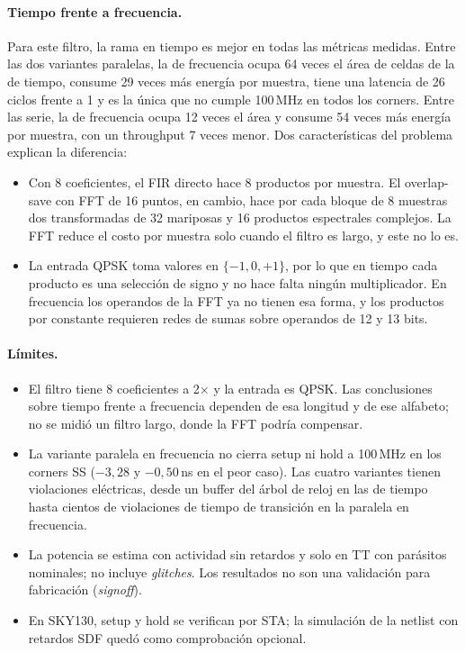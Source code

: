\paragraph{Tiempo frente a frecuencia.} Para este filtro, la rama en tiempo es mejor en todas las métricas medidas. Entre las dos variantes paralelas, la de frecuencia ocupa 64 veces el área de celdas de la de tiempo, consume 29 veces más energía por muestra, tiene una latencia de 26 ciclos frente a 1 y es la única que no cumple 100\,MHz en todos los corners. Entre las serie, la de frecuencia ocupa 12 veces el área y consume 54 veces más energía por muestra, con un throughput 7 veces menor. Dos características del problema explican la diferencia:
\begin{itemize}
  \item Con 8 coeficientes, el FIR directo hace 8 productos por muestra. El overlap-save con FFT de 16 puntos, en cambio, hace por cada bloque de 8 muestras dos transformadas de 32 mariposas y 16 productos espectrales complejos. La FFT reduce el costo por muestra solo cuando el filtro es largo, y este no lo es.
  \item La entrada QPSK toma valores en $\{-1, 0, +1\}$, por lo que en tiempo cada producto es una selección de signo y no hace falta ningún multiplicador. En frecuencia los operandos de la FFT ya no tienen esa forma, y los productos por constante requieren redes de sumas sobre operandos de 12 y 13 bits.
\end{itemize}

\paragraph{Límites.}
\begin{itemize}
  \item El filtro tiene 8 coeficientes a 2× y la entrada es QPSK. Las conclusiones sobre tiempo frente a frecuencia dependen de esa longitud y de ese alfabeto; no se midió un filtro largo, donde la FFT podría compensar.
  \item La variante paralela en frecuencia no cierra setup ni hold a 100\,MHz en los corners SS ($-3{,}28$ y $-0{,}50$\,ns en el peor caso). Las cuatro variantes tienen violaciones eléctricas, desde un buffer del árbol de reloj en las de tiempo hasta cientos de violaciones de tiempo de transición en la paralela en frecuencia.
  \item La potencia se estima con actividad sin retardos y solo en TT con parásitos nominales; no incluye \emph{glitches}. Los resultados no son una validación para fabricación (\emph{signoff}).
  \item En SKY130, setup y hold se verifican por STA; la simulación de la netlist con retardos SDF quedó como comprobación opcional.
\end{itemize}

